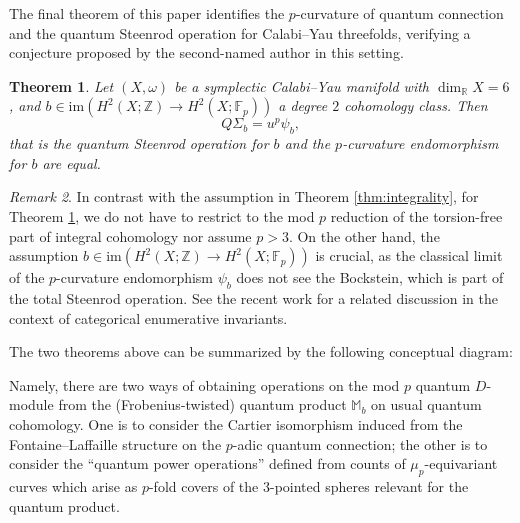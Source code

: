 \documentclass[reqno]{amsart}
\numberwithin{equation}{section}
\numberwithin{equation}{section}
\numberwithin{equation}{section}
\newtheorem{thm}{Theorem}[section]
\theoremstyle{definition}
\theoremstyle{remark}
\theoremstyle{remark}
\newtheorem{rem}[thm]{Remark}
\begin{document}
The final theorem of this paper identifies the $p$-curvature of quantum connection and the quantum Steenrod operation for Calabi--Yau threefolds, verifying a conjecture proposed by the second-named author in this setting.

\begin{thm}\label{thm:main}
    Let $(X,\omega)$ be a symplectic Calabi--Yau manifold with $\dim_{\mathbb{R}} X = 6$, and $b \in \mathrm{im}(H^2(X;\mathbb{Z}) \to H^2(X;\mathbb{F}_p))$ a degree $2$ cohomology class. Then
    \begin{equation}
        Q\Sigma_b = u^p \psi_b,
    \end{equation}
    that is the quantum Steenrod operation for $b$ and the $p$-curvature endomorphism for $b$ are equal.
\end{thm}

\begin{rem}
    In contrast with the assumption in Theorem \ref{thm:integrality}, for Theorem \ref{thm:main}, we do not have to restrict to the mod $p$ reduction of the torsion-free part of integral cohomology nor assume $p>3$. On the other hand, the assumption $b \in \mathrm{im}(H^2(X;\mathbb{Z}) \to H^2(X;\mathbb{F}_p))$ is crucial, as the classical limit of the $p$-curvature endomorphism $\psi_b$ does not see the Bockstein, which is part of the total Steenrod operation. See the recent work \cite{chen2026getzler} for a related discussion in the context of categorical enumerative invariants.
\end{rem}

The two theorems above can be summarized by the following conceptual diagram:

\begin{figure}[ht]
  \centering

\end{figure}
Namely, there are two ways of obtaining operations on the mod $p$ quantum $D$-module from the (Frobenius-twisted) quantum product $\mathbb{M}_b$ on usual quantum cohomology. One is to consider the Cartier isomorphism induced from the Fontaine--Laffaille structure on the $p$-adic quantum connection; the other is to consider the ``quantum power operations'' defined from counts of $\mu_p$-equivariant curves which arise as $p$-fold covers of the $3$-pointed spheres relevant for the quantum product. 
\end{document}
